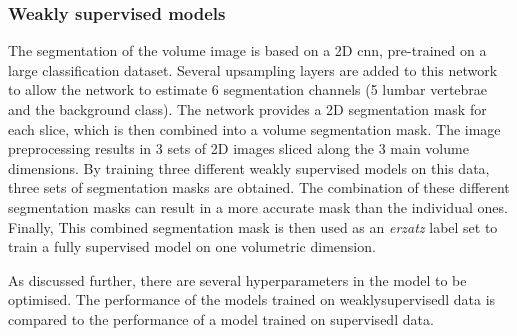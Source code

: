 \begin{multicols}{2}
\subsubsection*{Weakly supervised models}
\par{
    The segmentation of the volume image is based on a 2D \acrfull{cnn}, pre-trained on a large classification dataset.
    Several upsampling layers are added to this network to allow the network to estimate 6 segmentation channels (5 lumbar vertebrae and the background class). 
    The network provides a 2D segmentation mask for each slice, which is then combined into a volume segmentation mask. 
    The image preprocessing results in 3 sets of 2D images sliced along the 3 main volume dimensions.
    By training three different weakly supervised models on this data, three sets of segmentation masks are obtained. 
    The combination of these different segmentation masks can result in a more accurate mask than the individual ones.
    Finally, This combined segmentation mask is then used as an \textit{erzatz} label set to train a fully supervised model on one volumetric dimension.
}
\par{
    As discussed further, there are several hyperparameters in the model to be optimised.
    The performance of the models trained on \Gls{weaklysupervisedl} data is compared to the performance of a model trained on \Gls{supervisedl} data.
}


\end{multicols}
